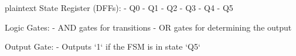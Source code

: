 plaintext
State Register (DFFs):
- Q0
- Q1
- Q2
- Q3
- Q4
- Q5

Logic Gates:
- AND gates for transitions
- OR gates for determining the output

Output Gate:
- Outputs `1` if the FSM is in state `Q5`